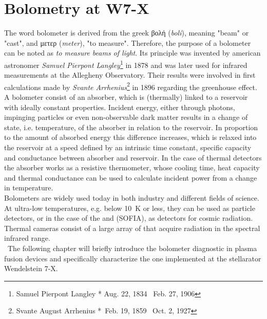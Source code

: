 %
\chapter{Bolometry at W7-X}\label{chap:bolometry}%
%
    The word bolometer is derived from the greek \textgreek{βολή} (\textit{boli}), meaning "beam" or "cast", and \textgreek{μετερ} (\textit{meter}), "to measure". Therefore, the purpose of a bolometer can be noted as \textit{to measure beams of light}. Its principle was invented by american astronomer \textit{Samuel Pierpont Langley}\footnote[1]{Samuel Pierpont Langley * Aug. 22, 1834 \textdagger~Feb. 27, 1906} in 1878 and was later used for infrared measurements at the Allegheny Observatory\cite{Langley1880,Langley1881}. Their results were involved in first calculations made by \textit{Svante Arrhenius}\footnote[2]{Svante August Arrhenius *~Feb. 19, 1859 \textdagger~Oct. 2, 1927} in 1896 regarding the greenhouse effect\cite{Arrhenius1896}.\\%
%
    \newline%
    A bolometer consist of an absorber, which is (thermally) linked to a reservoir with ideally constant properties. Incident energy, either through photons, impinging particles or even non-observable dark matter results in a change of state, i.e. temperature, of the absorber in relation to the reservoir. In proportion to the amount of absorbed energy this difference increases, which is relaxed into the reservoir at a speed defined by an intrinsic time constant, specific capacity and conductance between absorber and reservoir. In the case of thermal detectors the absorber works as a resistive thermometer, whose cooling time, heat capacity and thermal conductance can be used to calculate incident power from a change in temperature.\\%
    Bolometers are widely used today in both industry and different fields of science. At ultra-low temperatures, e.g. below \SI{10}{\kelvin} or less, they can be used as particle detectors, or in the case of the \cite{Gildemeister1999} and  (SOFIA), as detectors for cosmic radiation.\cite{Huebers2000} Thermal cameras consist of a large array of  that acquire radiation in the spectral infrared range\cite{Kumar2003}.\\%
    \,\newline%
    The following chapter will briefly introduce the bolometer diagnostic in plasma fusion devices and specifically characterize the one implemented at the stellarator Wendelstein 7-X.%
%
